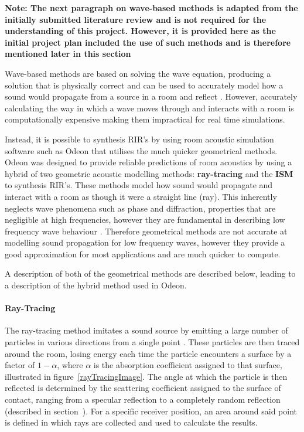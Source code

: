 \documentclass[../../main.tex]{subfiles}
\begin{document}
			\textbf{Note: The next paragraph on wave-based methods is adapted from the initially submitted literature review and is not required for the understanding of this project. However, it is provided here as the initial project plan included the use of such methods and is therefore mentioned later in this section}

			Wave-based methods are based on solving the wave equation, producing a solution that is physically correct and can be used to accurately model how a sound would propagate from a source in a room and reflect \cite{Siltanen2010}. However, accurately calculating the way in which a wave moves through and interacts with a room is computationally expensive making them impractical for real time simulations.

			Instead, it is possible to synthesis \ac{RIR}'s by using room acoustic simulation software such as Odeon \cite{odeon} that utilises the much quicker geometrical methods. Odeon was designed to provide reliable predictions of room acoustics by using a hybrid of two geometric acoustic modelling methods: \textbf{ray-tracing} and the \textbf{\ac{ISM}} to synthesis \ac{RIR}'s. These methods model how sound would propagate and interact with a room as though it were a straight line (ray). This inherently neglects wave phenomena such as phase and diffraction, properties that are negligible at high frequencies, however they are fundamental in describing low frequency wave behaviour \cite{Siltanen2010}. Therefore geometrical methods are not accurate at modelling sound propagation for low frequency waves, however they provide a good approximation for most applications and are much quicker to compute.

			A description of both of the geometrical methods are described below, leading to a description of the hybrid method used in Odeon.

		\paragraph{Ray-Tracing}
		\label{rayTracing}
			The ray-tracing method imitates a sound source by emitting a large number of particles in various directions from a single point \cite{Rindel1995}. These particles are then traced around the room,  losing energy each time the particle encounters a surface by a factor of $1 - \alpha$, where $\alpha$ is the absorption coefficient assigned to that surface, illustrated in figure~\ref{rayTracingImage}. The angle at which the particle is then reflected is determined by the scattering coefficient assigned to the surface of contact, ranging from a specular reflection to a completely random reflection \cite{odeonManual} (described in section~). For a specific receiver position, an area around said point is defined in which rays are collected and used to calculate the results.
\end{document}
